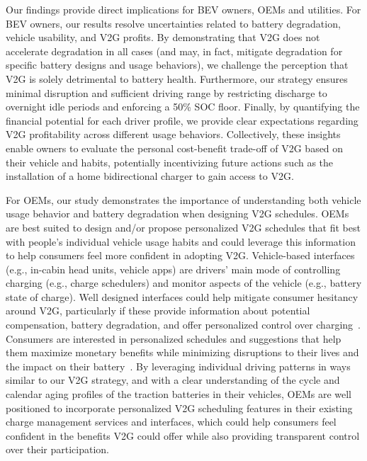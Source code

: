 \documentclass[pdflatex,sn-nature]{sn-jnl}%
\theoremstyle{thmstyleone}%
\theoremstyle{thmstyletwo}%
\theoremstyle{thmstylethree}%
\begin{document}
Our findings provide direct implications for BEV owners, OEMs and utilities. For BEV owners, our results resolve uncertainties related to battery degradation, vehicle usability, and V2G profits. By demonstrating that V2G does not accelerate degradation in all cases (and may, in fact, mitigate degradation for specific battery designs and usage behaviors), we challenge the perception that V2G is solely detrimental to battery health. Furthermore, our strategy ensures minimal disruption and sufficient driving range by restricting discharge to overnight idle periods and enforcing a 50\% SOC floor. Finally, by quantifying the financial potential for each driver profile, we provide clear expectations regarding V2G profitability across different usage behaviors. Collectively, these insights enable owners to evaluate the personal cost-benefit trade-off of V2G based on their vehicle and habits, potentially incentivizing future actions such as the installation of a home bidirectional charger to gain access to V2G.

For OEMs, our study demonstrates the importance of understanding both vehicle usage behavior and battery degradation when designing V2G schedules. OEMs are best suited to design and/or propose personalized V2G schedules that fit best with people's individual vehicle usage habits and could leverage this information to help consumers feel more confident in adopting V2G. Vehicle-based interfaces (e.g., in-cabin head units, vehicle apps) are drivers' main mode of controlling charging (e.g., charge schedulers) and monitor aspects of the vehicle (e.g., battery state of charge). Well designed interfaces could help mitigate consumer hesitancy around V2G, particularly if these provide information about potential compensation, battery degradation, and offer personalized control over charging~\cite{Monica_AutoUI, goncearuc2024barriers}. Consumers are interested in personalized schedules and suggestions that help them maximize monetary benefits while minimizing disruptions to their lives and the impact on their battery~\cite{Monica_AutoUI}. By leveraging individual driving patterns in ways similar to our V2G strategy, and with a clear understanding of the cycle and calendar aging profiles of the traction batteries in their vehicles, OEMs are well positioned to incorporate personalized V2G scheduling features in their existing charge management services and interfaces, which could help consumers feel confident in the benefits V2G could offer while also providing transparent control over their participation.
\end{document}
